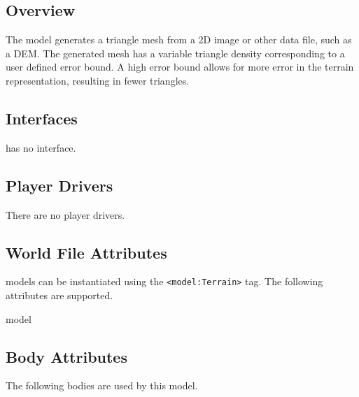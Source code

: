 \subsection{Overview}

The {\tt \modelName} model generates a triangle mesh from a 2D image or other
data file, such as a DEM. The generated mesh has a variable triangle density
corresponding to a user defined error bound. A high error bound allows for more error in the terrain representation, resulting in fewer triangles.

\subsection{\libgazebo Interfaces}

{\tt \modelName} has no \libgazebo interface.

\subsection{Player Drivers}

There are no player drivers.

\subsection{World File Attributes}

{\tt \modelName} models can be instantiated using the
\verb+<model:Terrain>+ tag.  The following attributes are
supported.

\begin{xmlattrtable}{model}{\modelName}
\modeldefaults
{}
\end{xmlattrtable}


\subsection{Body Attributes}

The following bodies are used by this model.

\begin{bodyattrtable}
\bodydefaults
\end{bodyattrtable}

